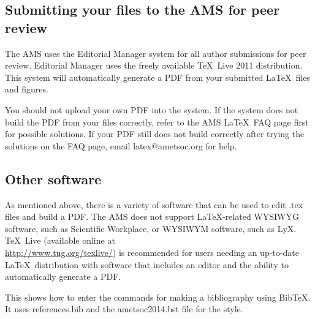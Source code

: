 \documentclass{ametsoc}
\begin{document}
\subsection{Submitting your files to the AMS for peer review}
The AMS uses the Editorial Manager system for all author submissions for
peer review. Editorial Manager uses the freely available \TeX\ Live 2011
distribution. This system will automatically generate a PDF from your
submitted \LaTeX\ files and figures.  

You should not upload your own PDF into
the system. If the system does not build the PDF from your files correctly,
refer to the AMS \LaTeX\ FAQ page first for possible solutions. If your PDF
still does not build correctly after trying the solutions on the FAQ page, email
latex@ametsoc.org for help.

\subsection{Other software}
As mentioned above, there is a variety of software that can be used to edit
.tex files and build a PDF.  The AMS does not support \LaTeX\/-related
WYSIWYG software, such as Scientific Workplace, or WYSIWYM software, such as
LyX.  \TeX\ Live (available online at \\ \url{http://www.tug.org/texlive/}) is
recommended for users needing an up-to-date \LaTeX\ distribution with
software that includes an editor and the ability to automatically generate a
PDF.




 This shows how to enter the commands for making a bibliography using
 BibTeX. It uses references.bib and the ametsoc2014.bst file for the style.

 
 

\end{document}
